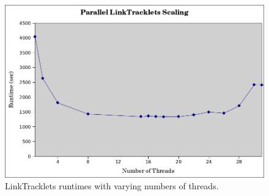 \begin{figure}[ht!]
\centering
\includegraphics[width=16cm]{newIllustrations/linkTracklets_scaling.png}
\caption{LinkTracklets runtimes with varying numbers of threads.}
\label{threadScaling}
\end{figure}


